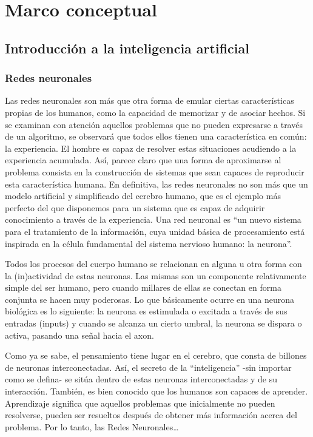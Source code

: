 \section{Marco conceptual}
\subsection{Introducción a la inteligencia artificial}

\subsubsection{Redes neuronales}

Las redes neuronales son más que otra forma de emular ciertas características propias de los humanos, como la capacidad de memorizar y de asociar hechos. Si se examinan con atención aquellos problemas que no pueden expresarse a través de un algoritmo, se observará que todos ellos tienen una característica en común: la experiencia. El hombre es capaz de resolver estas situaciones acudiendo a la experiencia acumulada. Así, parece claro que una forma de aproximarse al problema consista en la construcción de sistemas que sean capaces de reproducir esta característica humana. En definitiva, las redes neuronales no son más que un modelo artificial y simplificado del cerebro humano, que es el ejemplo más perfecto del que disponemos para un sistema que es capaz de adquirir conocimiento a través de la experiencia. Una red neuronal es “un nuevo sistema para el tratamiento de la información, cuya unidad básica de procesamiento está inspirada en la célula fundamental del sistema nervioso humano: la neurona”.

Todos los procesos del cuerpo humano se relacionan en alguna u otra forma con la (in)actividad de estas neuronas. Las mismas son un componente relativamente simple del ser humano, pero cuando millares de ellas se conectan en forma conjunta se hacen muy poderosas. Lo que básicamente ocurre en una neurona biológica es lo siguiente: la neurona es estimulada o excitada a través de sus entradas (inputs) y cuando se alcanza un cierto umbral, la neurona se dispara o activa, pasando una señal hacia el axon.

Como ya se sabe, el pensamiento tiene lugar en el cerebro, que consta de billones de neuronas interconectadas. Así, el secreto de la “inteligencia” -sin importar como se defina- se sitúa dentro de estas neuronas interconectadas y de su interacción. También, es bien conocido que los humanos son capaces de aprender. Aprendizaje significa que aquellos problemas que inicialmente no pueden resolverse, pueden ser resueltos después de obtener más información acerca del problema. Por lo tanto, las Redes Neuronales…

